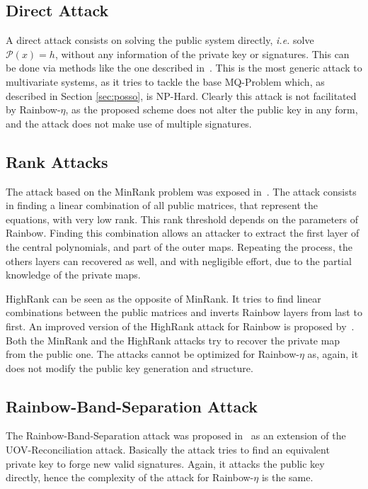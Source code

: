 \documentclass{ufsctex/ufsctex}
\begin{document}
\subsection{Direct Attack}

A direct attack consists on solving the public system directly, \textit{i.e.}
solve $\mathcal{P}(x) = h$, without any information of the private key or
signatures. This can be done via methods like the one described
in~\cite{bettale2009hybrid}. This is the most generic attack to multivariate
systems, as it tries to tackle the base MQ-Problem which, as described in
Section \ref{sec:posso}, is NP-Hard. Clearly this attack is not facilitated by
Rainbow-$\eta$, as the proposed scheme does not alter the public key in any
form, and the attack does not make use of multiple signatures.

\subsection{Rank Attacks}

The attack based on the MinRank problem was exposed
in~\cite{billet2006cryptanalysis}. The attack consists in finding a linear
combination of all public matrices, that represent the equations, with very low
rank. This rank threshold depends on the parameters of Rainbow. Finding this
combination allows an attacker to extract the first layer of the central
polynomials, and part of the outer maps. Repeating the process, the others
layers can recovered as well, and with negligible effort, due to the partial
knowledge of the private maps.

HighRank can be seen as the opposite of MinRank. It tries to find linear
combinations between the public matrices and inverts Rainbow layers from last
to first. An improved version of the HighRank attack for Rainbow is proposed
by~\cite{ding2008new}. Both the MinRank and the HighRank attacks try to recover
the private map from the public one. The attacks cannot be optimized for
Rainbow-$\eta$ as, again, it does not modify the public key generation and
structure.

\subsection{Rainbow-Band-Separation Attack}

The Rainbow-Band-Separation attack was proposed in~\cite{ding2008new} as an
extension of the UOV-Reconciliation attack. Basically the attack tries to find
an equivalent private key to forge new valid signatures. Again, it attacks the
public key directly, hence the complexity of the attack for Rainbow-$\eta$ is
the same.
\end{document}
